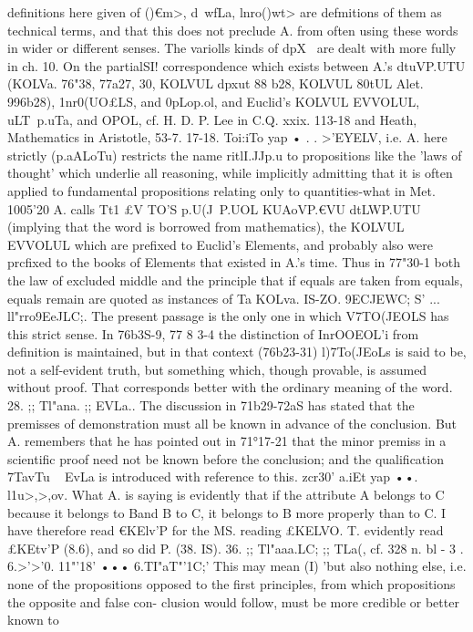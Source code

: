 definitions here given of ()€m>, d~{wfLa, lnro()wt> are defmitions of
them as technical terms, and that this does not preclude A. from
often using these words in wider or different senses. The variolls
kinds of dpX~ are dealt with more fully in ch. 10. On the partialSI!
correspondence which exists between A.'s dtuVP.UTU (KOLVa. 76"38,
77a27, 30, KOLVUL dpxut 88 b28, KOLVUL 80tUL Alet. 996b28), 1nr0(UO£LS,
and 0pLop.ol, and Euclid's KOLVUL EVVOLUL, uLT~p.uTa, and OPOL, cf.
H. D. P. Lee in C.Q. xxix. 113-18 and Heath, Mathematics in
Aristotle, 53-7.
17-18. Toi:iTo yap • . . >'EYELV, i.e. A. here strictly (p.aALoTu)
restricts the name ritlI.JJp.u to propositions like the 'laws of thought'
which underlie all reasoning, while implicitly admitting that it
is often applied to fundamental propositions relating only to
quantities-what in Met. 1005'20 A. calls Tt1 £V TO'S p.U(J~P.UOL
KUAoVP.€VU dtLWP.UTU (implying that the word is borrowed from
mathematics), the KOLVUL EVVOLUL which are prefixed to Euclid's
Elements, and probably also were prcfixed to the books of
Elements that existed in A.'s time. Thus in 77"30-1 both the law
of excluded middle and the principle that if equals are taken
from equals, equals remain are quoted as instances of Ta KOLva.
IS-ZO. 9ECJEWC; S' ... ll"rro9EeJLC;. The present passage is the only
one in which V7TO(JEOLS has this strict sense. In 76b3S-9, 77 8 3-4 the
distinction of InrOOEOL'i from definition is maintained, but in that
context (76b23-31) l)7To(JEoLs is said to be, not a self-evident truth,
but something which, though provable, is assumed without
proof. That corresponds better with the ordinary meaning of
the word.
28. ;; Tl"ana. ;; EVLa.. The discussion in 71b29-72aS has stated
that the premisses of demonstration must all be known in advance
of the conclusion. But A. remembers that he has pointed out
in 71°17-21 that the minor premiss in a scientific proof need not
be known before the conclusion; and the qualification ~ 7TavTu
~ EvLa is introduced with reference to this.
zcr30' a.iEt yap ••. l1u>,>,ov. What A. is saying is evidently
that if the attribute A belongs to C because it belongs to Band
B to C, it belongs to B more properly than to C. I have therefore
read €KElv'P for the MS. reading £KELVO. T. evidently read £KEtv'P
(8.6), and so did P. (38. IS).
36. ;; Tl"aaa.LC; ;; TLa(, cf. 328 n.
bl - 3 . 6.>'>'0. 11"'18' ••• 6.TI"aT"'1C;' This may mean (I) 'but also
nothing else, i.e. none of the propositions opposed to the first
principles, from which propositions the opposite and false con-
clusion would follow, must be more credible or better known to
}
